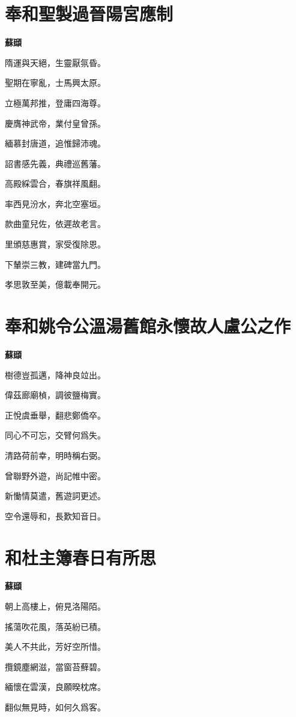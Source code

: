 \documentclass[12pt,a4paper]{ctexbook}
\begin{document}
\section{奉和聖製過晉陽宮應制}
\textbf{蘇頲}\par\vspace{0.5em}
隋運與天絕，生靈厭氛昏。\par
聖期在寧亂，士馬興太原。\par
立極萬邦推，登庸四海尊。\par
慶膺神武帝，業付皇曾孫。\par
緬慕封唐道，追惟歸沛魂。\par
詔書感先義，典禮巡舊藩。\par
高殿綵雲合，春旗祥風翻。\par
率西見汾水，奔北空塞垣。\par
款曲童兒佐，依遲故老言。\par
里頒慈惠賞，家受復除恩。\par
下輦崇三教，建碑當九門。\par
孝思敦至美，億載奉開元。\par

\section{奉和姚令公溫湯舊館永懷故人盧公之作}
\textbf{蘇頲}\par\vspace{0.5em}
樹德豈孤邁，降神良竝出。\par
偉茲廊廟楨，調彼鹽梅實。\par
正悅虞垂舉，翻悲鄭僑卒。\par
同心不可忘，交臂何爲失。\par
清路荷前幸，明時稱右弼。\par
曾聯野外遊，尚記帷中密。\par
新慟情莫遣，舊遊詞更述。\par
空令還辱和，長歎知音日。\par

\section{和杜主簿春日有所思}
\textbf{蘇頲}\par\vspace{0.5em}
朝上高樓上，俯見洛陽陌。\par
搖蕩吹花風，落英紛已積。\par
美人不共此，芳好空所惜。\par
攬鏡塵網滋，當窗苔蘚碧。\par
緬懷在雲漢，良願暌枕席。\par
翻似無見時，如何久爲客。\par
\end{document}
